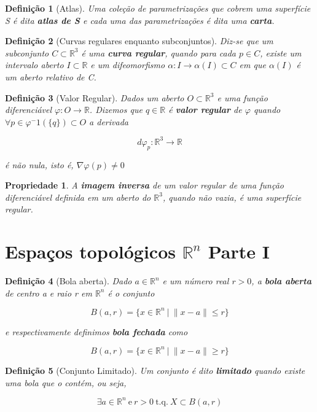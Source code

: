 \documentclass{article}
\newtheorem{prop}{Propriedade}
\newtheorem{definition}{Definição}
\begin{document}
\begin{definition}[Atlas]
Uma coleção de parametrizações que cobrem uma superfície S é dita \textbf{atlas de S} e cada uma das parametrizações é dita uma \textbf{carta}.
\end{definition}

\begin{definition}[Curvas regulares enquanto subconjuntos]
Diz-se que um subconjunto $C \subset \mathbb{R}^3$ é uma \textbf{curva regular}, quando para cada $p \in C$, existe um intervalo aberto $I \subset \mathbb{R}$ e um difeomorfismo $\alpha: I \rightarrow \alpha(I) \subset C$ em que $\alpha(I)$ é um aberto relativo de C.
\end{definition}

\begin{definition}[Valor Regular]
Dados um aberto $O \subset \mathbb{R}^3$ e uma função diferenciável $\varphi: O \rightarrow \mathbb{R}$. Dizemos que $q \in \mathbb{R}$ é \textbf{valor regular} de $\varphi$ quando $\forall p \in \varphi^-1(\{q\}) \subset O$ a derivada

$$d\varphi_p: \mathbb{R}^3 \rightarrow \mathbb{R}$$

é não nula, isto é, $\nabla \varphi(p) \neq 0$
\end{definition}

\begin{prop}
A \textbf{imagem inversa} de um valor regular de uma função diferenciável definida em um aberto do $\mathbb{R}^3$, quando não vazia, é uma superfície regular.
\end{prop}

\section*{Espaços topológicos $\mathbb{R}^n$ Parte I}
\label{s9}
\begin{definition}[Bola aberta]
Dado $a \in \mathbb{R}^n$ e um número real $r > 0$, a \textbf{bola aberta} de centro a e raio r em $\mathbb{R}^n$ é o conjunto

$$B(a, r) = \{ x \in \mathbb{R}^n\ |\ \| x - a \| \leq r \}$$

e respectivamente definimos \textbf{bola fechada} como

$$B(a, r) = \{ x \in \mathbb{R}^n\ |\ \| x - a \| \geq r \}$$
\end{definition}

\begin{definition}[Conjunto Limitado]
Um conjunto é dito \textbf{limitado} quando existe uma bola que o contém, ou seja,

$$\exists a \in \mathbb{R}^n\ \mathrm{e}\ r>0\ \mathrm{t.q.}\ X \subset B(a, r)$$
\end{definition}
\end{document}

